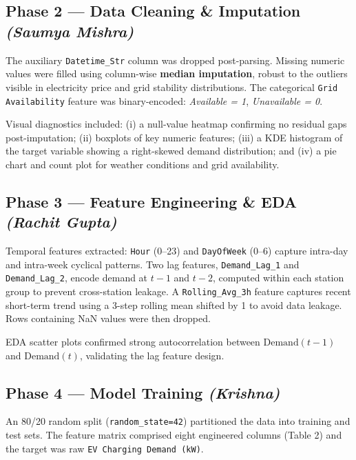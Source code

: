 \documentclass[12pt, a4paper]{article}
\begin{document}
\subsection{Phase 2 --- Data Cleaning \& Imputation \textnormal{\small\itshape(Saumya Mishra)}}

The auxiliary \texttt{Datetime\_Str} column was dropped post-parsing. Missing numeric
values were filled using column-wise \textbf{median imputation}, robust to the outliers
visible in electricity price and grid stability distributions. The categorical
\texttt{Grid Availability} feature was binary-encoded:
\textit{Available = 1}, \textit{Unavailable = 0}.

Visual diagnostics included: (i) a null-value heatmap confirming no residual gaps
post-imputation; (ii) boxplots of key numeric features; (iii) a KDE histogram of the
target variable showing a right-skewed demand distribution; and (iv) a pie chart and
count plot for weather conditions and grid availability.

\subsection{Phase 3 --- Feature Engineering \& EDA \textnormal{\small\itshape(Rachit Gupta)}}

Temporal features extracted: \texttt{Hour} (0--23) and \texttt{DayOfWeek} (0--6)
capture intra-day and intra-week cyclical patterns. Two lag features,
\texttt{Demand\_Lag\_1} and \texttt{Demand\_Lag\_2}, encode demand at $t-1$ and $t-2$,
computed within each station group to prevent cross-station leakage. A
\texttt{Rolling\_Avg\_3h} feature captures recent short-term trend using a 3-step
rolling mean shifted by 1 to avoid data leakage. Rows containing NaN values were
then dropped.

EDA scatter plots confirmed strong autocorrelation between $\text{Demand}(t-1)$ and
$\text{Demand}(t)$, validating the lag feature design.

\subsection{Phase 4 --- Model Training \textnormal{\small\itshape(Krishna)}}

An 80/20 random split (\texttt{random\_state=42}) partitioned the data into training
and test sets. The feature matrix comprised eight engineered columns (Table 2) and
the target was raw \texttt{EV Charging Demand (kW)}.
\end{document}
